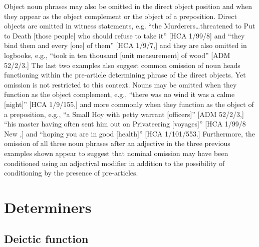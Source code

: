 Object noun phrases may also be omitted in the direct object position and when they appear as the object complement or the object of a preposition. Direct objects are omitted in witness statements, e.g. “the Murderers…threatened to Put to Death [those people] who should refuse to take it” [HCA 1/99/8] and “they bind them and every [one] of them” [HCA 1/9/7,] and they are also omitted in logbooks, e.g., “took in ten thousand [unit measurement] of wood” [ADM 52/2/3.] The last two examples also suggest common omission of noun heads functioning within the pre-article determining phrase of the direct objects. Yet omission is not restricted to this context. Nouns may be omitted when they function as the object complement, e.g., “there was no wind it was a calme [night]” [HCA 1/9/155,] and more commonly when they function as the object of a preposition, e.g., “a Small Hoy with petty warrant [officers]” [ADM 52/2/3,] “his master having often sent him out on Privateering [voyages]” [HCA 1/99/8 New \citealt{Providence1722},] and “hoping you are in good [health]” [HCA 1/101/553.] Furthermore, the omission of all three noun phrases after an adjective in the three previous examples shown appear to suggest that nominal omission may have been conditioned using an adjectival modifier in addition to the possibility of conditioning by the presence of pre-articles. 

\section{{Determiners}}%

\subsection{{Deictic} {function}}%

